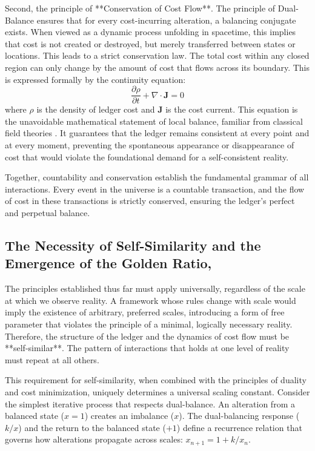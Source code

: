 Second, the principle of **Conservation of Cost Flow**. The principle of Dual-Balance ensures that for every cost-incurring alteration, a balancing conjugate exists. When viewed as a dynamic process unfolding in spacetime, this implies that cost is not created or destroyed, but merely transferred between states or locations. This leads to a strict conservation law. The total cost within any closed region can only change by the amount of cost that flows across its boundary. This is expressed formally by the continuity equation:
\begin{equation}
\frac{\partial\rho}{\partial t} + \nabla \cdot \mathbf{J} = 0
\end{equation}
where \(\rho\) is the density of ledger cost and \(\mathbf{J}\) is the cost current. This equation is the unavoidable mathematical statement of local balance, familiar from classical field theories \parencite{Jackson1999}. It guarantees that the ledger remains consistent at every point and at every moment, preventing the spontaneous appearance or disappearance of cost that would violate the foundational demand for a self-consistent reality.

Together, countability and conservation establish the fundamental grammar of all interactions. Every event in the universe is a countable transaction, and the flow of cost in these transactions is strictly conserved, ensuring the ledger's perfect and perpetual balance.

\subsection{The Necessity of Self-Similarity and the Emergence of the Golden Ratio, }
The principles established thus far must apply universally, regardless of the scale at which we observe reality. A framework whose rules change with scale would imply the existence of arbitrary, preferred scales, introducing a form of free parameter that violates the principle of a minimal, logically necessary reality. Therefore, the structure of the ledger and the dynamics of cost flow must be **self-similar**. The pattern of interactions that holds at one level of reality must repeat at all others.

This requirement for self-similarity, when combined with the principles of duality and cost minimization, uniquely determines a universal scaling constant. Consider the simplest iterative process that respects dual-balance. An alteration from a balanced state (\(x=1\)) creates an imbalance (\(x\)). The dual-balancing response (\(k/x\)) and the return to the balanced state (\(+1\)) define a recurrence relation that governs how alterations propagate across scales: \(x_{n+1} = 1 + k/x_n\).

